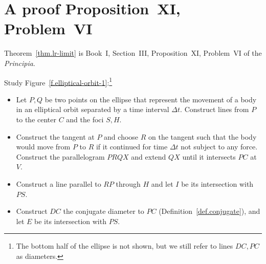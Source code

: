 

\chapter{A proof Proposition~XI, Problem~VI}
\label{s.centripetal}

Theorem~\ref{thm.lr-limit} is Book~I, Section~III, Proposition~XI, Problem~VI of the \emph{Principia}.

Study Figure~\ref{f.elliptical-orbit-1}:\footnote{The bottom half of the ellipse is not shown, but we still refer to lines $DC,PC$ as diameters.}
\begin{itemize}
\item Let $P,Q$ be two points on the ellipse that represent the movement of a body in an elliptical orbit separated by a time interval $\Delta t$. Construct lines from $P$ to the center $C$ and the foci $S,H$.

\item Construct the tangent at $P$ and choose $R$ on the tangent such that the body would move from $P$ to $R$ if it continued for time $\Delta t$ not subject to any force. Construct the parallelogram $PRQX$ and extend $QX$ until it intersects $PC$ at $V$.

\item Construct a line parallel to $RP$ through $H$ and let $I$ be its intersection with $PS$. 

\item Construct $DC$ the conjugate diameter to $PC$ (Definition~\ref{def.conjugate}), and let $E$ be its intersection with $PS$.
\end{itemize}


